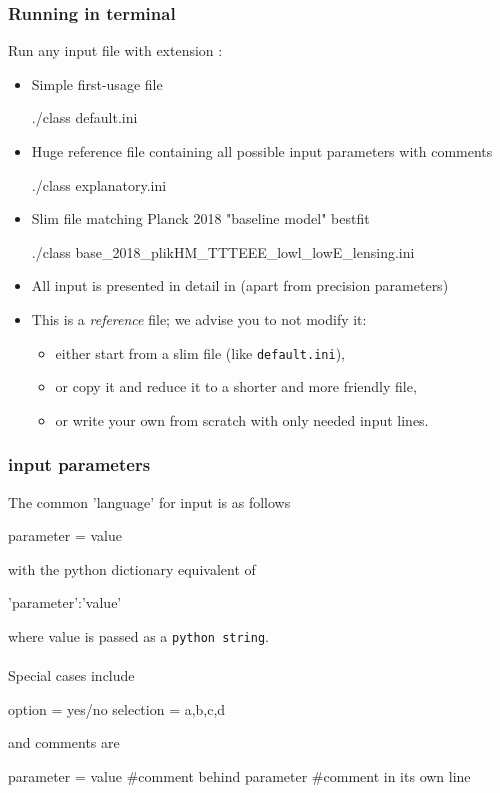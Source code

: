 \begin{frame}[fragile]
\frametitle{Running \CLASS{} in terminal}

Run any input file with extension :
\hspace*{-2em}
\begin{itemize}
	\item Simple first-usage file \begin{class}
./class default.ini
	\end{class}
	\item Huge reference file containing all possible input parameters with comments
	\begin{class}
./class explanatory.ini
	\end{class}
	\item Slim file matching Planck 2018 "baseline model" bestfit \\ \begin{class}
./class base_2018_plikHM_TTTEEE_lowl_lowE_lensing.ini
	\end{class}
\end{itemize}
\pause
\begin{itemize}
	\item
	All input is presented in detail in  (apart from precision parameters)
	\item
	This is a \textit{reference} file; we advise you to not modify it: 
	\begin{itemize}
		\item {\scriptsize either start from a slim file (like {\tt default.ini}), }
		\item
		{\scriptsize or copy it and reduce it to a shorter and more friendly file, }
		\item {\scriptsize or write your own from scratch with only needed input lines.}
	\end{itemize}
\end{itemize}


\end{frame}



\begin{frame}[fragile]
	\frametitle{{\Red \CLASS{}} input parameters}
	The common 'language' for input is as follows
\begin{class}
parameter = value
\end{class}
with the python dictionary equivalent of
\begin{class}
{'parameter':'value'}
\end{class}
where value is passed as a {\Red \tt python string}.\\

\mbox{}\\

\pause
Special cases include
\begin{class}
option = yes/no
selection = a,b,c,d
\end{class}
and comments are
\begin{class}
parameter = value #comment behind parameter
#comment in its own line
\end{class}
\end{frame}




